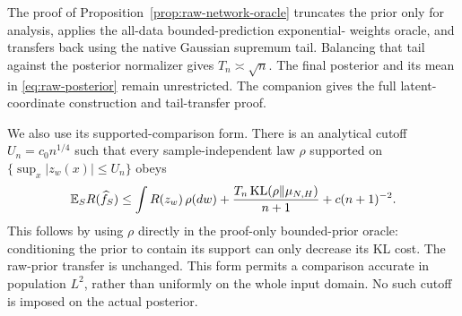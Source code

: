 The proof of Proposition~\ref{prop:raw-network-oracle} truncates the prior
only for analysis, applies the all-data bounded-prediction exponential-
weights oracle, and transfers back using the native Gaussian supremum
tail.  Balancing that tail against the posterior normalizer gives
$T_n\asymp\sqrt n$.  The final posterior and its mean in
\eqref{eq:raw-posterior} remain unrestricted.  The companion gives the
full latent-coordinate construction and tail-transfer proof.

We also use its supported-comparison form.  There is an analytical cutoff
$U_n=c_0 n^{1/4}$ such that every sample-independent law $\rho$ supported
on $\{\sup_x|z_w(x)|\le U_n\}$ obeys
\begin{equation}\label{eq:raw-supported-oracle}
 \mathbb E_S R(\widehat f_S)\le \int R(z_w)\,\rho(dw)
   +\frac{T_n\operatorname{KL}(\rho\|\mu_{N,H})}{n+1}
   +c(n+1)^{-2}.
\end{equation}
This follows by using $\rho$ directly in the proof-only bounded-prior
oracle: conditioning the prior to contain its support can only decrease
its KL cost.  The raw-prior transfer is unchanged.  This form permits a
comparison accurate in population $L^2$, rather than uniformly on the
whole input domain.  No such cutoff is imposed on the actual posterior.
